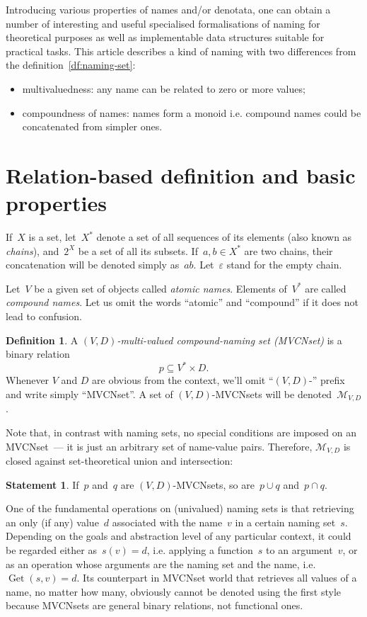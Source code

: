 \documentclass{article}
\theoremstyle{definition}
\newtheorem{Df}{Definition}
\newtheorem{St}{Statement}
\newcommand{\setcharmvcn}{M}
\newcommand{\setsymbol}[3]{\mathcal{#1}_{#2,#3}}
\newcommand{\setmvcn}[2]{\setsymbol{\setcharmvcn}{#1}{#2}}
\newcommand{\deref}{\operatorname{Get}}
\begin{document}
Introducing various properties of names and/or denotata, one can obtain a
number of interesting and useful specialised formalisations of naming for
theoretical purposes as well as implementable data structures suitable for
practical tasks. This article describes a kind of naming with
two differences from the definition~\ref{df:naming-set}:
\begin{itemize}
\item multivaluedness: any name can be related to zero or more values;
\item compoundness of names: names form a monoid i.e. compound names could
be concatenated from simpler ones.
\end{itemize}


\section{Relation-based definition and basic properties}

If~$X$ is a set, let~$X^\ast$ denote a set of all sequences of its elements
(also known as \emph{chains}), and~$2^X$ be a set of all its subsets.
If~$a,b\in X^\ast$ are two chains, their concatenation will be denoted simply
as~$ab$. Let~$\varepsilon$ stand for the empty chain.

Let~$V$ be a given set of objects called \emph{atomic names}. Elements
of~$V^\ast$ are called \emph{compound names}. Let us omit the words ``atomic''
and ``compound'' if it does not lead to confusion.

\begin{Df}\label{df:mvcn}
A \emph{$(V,D)$-multi-valued compound-naming set (MVCNset)} is a binary
relation
\[
  p \subseteq V^\ast \times D .
\]
Whenever $V$ and $D$ are obvious from the context, we'll omit ``$(V,D)$-''
prefix and write simply ``MVCNset''. A set of $(V,D)$-MVCNsets will be
denoted~$\setmvcn{V}{D}$.
\end{Df}

Note that, in contrast with naming sets, no special conditions are imposed
on an MVCNset~--- it is just an arbitrary set of name-value pairs.
Therefore, $\setmvcn{V}{D}$ is closed against set-theoretical union
and intersection:
\begin{St}\label{st:mvcn-setop}
If~$p$ and~$q$ are $(V,D)$-MVCNsets, so are~$p\cup q$ and~$p\cap q$.
\end{St}

One of the fundamental operations on (univalued) naming sets is that retrieving
an only (if any) value~$d$ associated with the name~$v$ in a certain naming
set~$s$.  Depending on the goals and abstraction level of any particular
context, it could be regarded either as~$s(v)=d$, i.e. applying a function~$s$
to an argument~$v$, or as an operation whose arguments are the naming set and
the name, i.e.~$\deref(s, v)=d$. Its counterpart in MVCNset world that
retrieves all values of a name, no matter how many, obviously cannot be denoted
using the first style because MVCNsets are general binary relations, not
functional ones.
\end{document}
